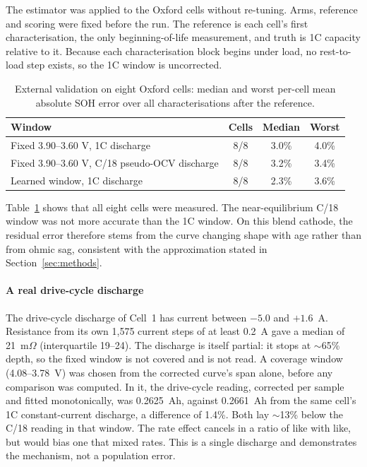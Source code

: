 \documentclass[preprint,12pt,authoryear]{elsarticle}
\begin{document}
The estimator was applied to the Oxford cells without re-tuning. Arms,
reference and scoring were fixed before the run. The reference is each cell's
first characterisation, the only beginning-of-life measurement, and truth is
1C capacity relative to it. Because each characterisation block begins under
load, no rest-to-load step exists, so the 1C window is uncorrected.

\begin{table}[t]
\centering
\caption{External validation on eight Oxford cells: median and worst per-cell
mean absolute SOH error over all characterisations after the reference.}
\label{tab:oxford}
\begin{tabular}{lccc}
\toprule
Window & Cells & Median & Worst \\
\midrule
Fixed 3.90--3.60 V, 1C discharge & 8/8 & 3.0\% & 4.0\% \\
Fixed 3.90--3.60 V, C/18 pseudo-OCV discharge & 8/8 & 3.2\% & 3.4\% \\
Learned window, 1C discharge & 8/8 & 2.3\% & 3.6\% \\
\bottomrule
\end{tabular}
\end{table}

Table~\ref{tab:oxford} shows that all eight cells were measured. The
near-equilibrium C/18 window was not more accurate than the 1C window. On this
blend cathode, the residual error therefore stems from the curve changing shape
with age rather than from ohmic sag, consistent with the approximation stated
in Section~\ref{sec:methods}.

\paragraph{A real drive-cycle discharge}
The drive-cycle discharge of Cell~1 has current between $-5.0$ and $+1.6$~A.
Resistance from its own 1{,}575 current steps of at least 0.2~A gave a median
of 21~m$\Omega$ (interquartile 19--24). The discharge is itself partial:
it stops at ${\sim}$65\% depth, so the fixed window is not covered and is not
read. A coverage window (4.08--3.78~V) was chosen from the corrected curve's
span alone, before any comparison was computed. In it, the drive-cycle reading,
corrected per sample and fitted monotonically, was 0.2625~Ah, against 0.2661~Ah
from the same cell's 1C constant-current discharge, a difference of 1.4\%.
Both lay ${\sim}$13\% below the C/18 reading in that window. The rate effect
cancels in a ratio of like with like, but would bias one that mixed rates. This
is a single discharge and demonstrates the mechanism, not a population error.
\end{document}

